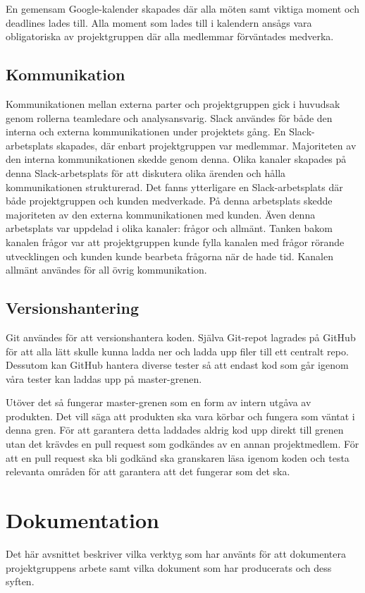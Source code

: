 En gemensam Google-kalender skapades där alla möten samt viktiga moment och deadlines lades till. Alla moment som lades till i kalendern ansågs vara obligatoriska av projektgruppen där alla medlemmar förväntades medverka.

\subsection{Kommunikation}
Kommunikationen mellan externa parter och projektgruppen gick i huvudsak genom rollerna teamledare och analysansvarig. Slack användes för både den interna och externa kommunikationen under projektets gång. En Slack-arbetsplats skapades, där enbart projektgruppen var medlemmar. Majoriteten av den interna kommunikationen skedde genom denna. Olika kanaler skapades på denna Slack-arbetsplats för att diskutera olika ärenden och hålla kommunikationen strukturerad. Det fanns ytterligare en Slack-arbetsplats där både projektgruppen och kunden medverkade. På denna arbetsplats skedde majoriteten av den externa kommunikationen med kunden. Även denna arbetsplats var uppdelad i olika kanaler: frågor och allmänt. Tanken bakom kanalen frågor var att projektgruppen kunde fylla kanalen med frågor rörande utvecklingen och kunden kunde bearbeta frågorna när de hade tid. Kanalen allmänt användes för all övrig kommunikation.

\subsection{Versionshantering}
Git användes för att versionshantera koden. Själva Git-repot lagrades på GitHub för att alla lätt skulle kunna ladda ner och ladda upp filer till ett centralt repo. Dessutom kan GitHub hantera diverse tester så att endast kod som går igenom våra tester kan laddas upp på master-grenen.

Utöver det så fungerar master-grenen som en form av intern utgåva av produkten. Det vill säga att produkten ska vara körbar och fungera som väntat i denna gren. För att garantera detta laddades aldrig kod upp direkt till grenen utan det krävdes en pull request som godkändes av en annan projektmedlem. För att en pull request ska bli godkänd ska granskaren läsa igenom koden och testa relevanta områden för att garantera att det fungerar som det ska.

\section{Dokumentation}
\label{sec:method-documentation}
Det här avsnittet beskriver vilka verktyg som har använts för att dokumentera projektgruppens arbete samt vilka dokument som har producerats och dess syften.

